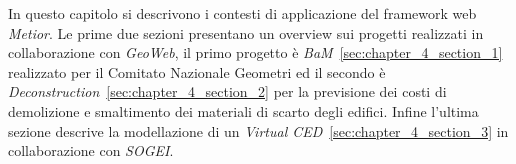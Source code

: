 In questo capitolo si descrivono i contesti di applicazione del framework web \emph{Metior}.
Le prime due sezioni presentano un overview sui progetti realizzati in collaborazione con \emph{GeoWeb},
il primo progetto è \emph{BaM}~\ref{sec:chapter_4_section_1} realizzato per il Comitato Nazionale Geometri
ed il secondo è \emph{Deconstruction}~\ref{sec:chapter_4_section_2} per la previsione dei
costi di demolizione e smaltimento dei materiali di scarto degli edifici.
Infine l'ultima sezione descrive la modellazione di un \emph{Virtual CED}~\ref{sec:chapter_4_section_3}
in collaborazione con \emph{SOGEI}.
